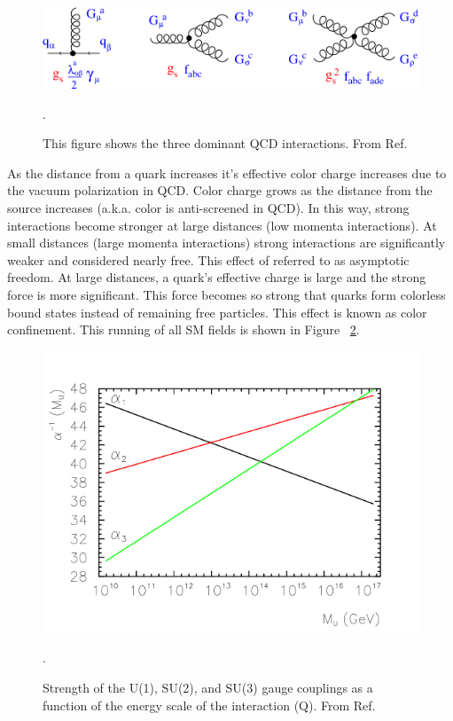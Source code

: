 \begin{figure}[h!]
  \centering
  \includegraphics[width=\hsize]{figures/Theory/QCD_vertices.png}
  \caption{This figure shows the three dominant QCD interactions. From Ref. \cite{pich}}. 
  \label{fig:QCDinteractions}
\end{figure}
\FloatBarrier


As the distance from a quark increases it's effective color charge increases due to the vacuum polarization in QCD. Color charge grows as the distance from the source increases (a.k.a. color is anti-screened in QCD).  In this way, strong interactions become stronger at large distances (low momenta interactions).  At small distances (large momenta interactions) strong interactions are significantly weaker and considered nearly free. This effect of referred to as asymptotic freedom. At large distances, a quark's effective charge is large and the strong force is more significant. This force becomes so strong that quarks form colorless bound states instead of remaining free particles. This effect is known as color confinement. This running of all SM fields is shown in Figure ~\ref{fig:sm_couplings}. 

\begin{figure}[h!]
  \centering
  \includegraphics[width=\hsize]{figures/Theory/runningcouplings.png}
  \caption{Strength of the U(1), SU(2), and SU(3) gauge couplings as a function of the energy scale of the interaction (Q). From Ref. \cite{runningcouplings}}. 
  \label{fig:sm_couplings}
\end{figure}
\FloatBarrier



